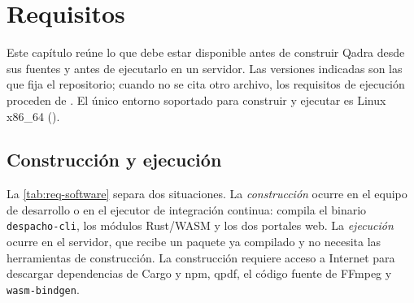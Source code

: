 \chapter{Requisitos}\label{cap:requisitos}

Este capítulo reúne lo que debe estar disponible antes de construir Qadra
desde sus fuentes y antes de ejecutarlo en un servidor. Las versiones
indicadas son las que fija el repositorio; cuando no se cita otro archivo,
los requisitos de ejecución proceden de . El
único entorno soportado para construir y ejecutar es
Linux x86\_64 ().

\section{Construcción y ejecución}\label{sec:req-tabla}

La \cref{tab:req-software} separa dos situaciones. La \emph{construcción}
ocurre en el equipo de desarrollo o en el ejecutor de integración continua:
compila el binario \texttt{despacho-cli}, los módulos Rust/WASM y los dos
portales web. La \emph{ejecución} ocurre en el servidor, que recibe un
paquete ya compilado y no necesita las herramientas de construcción. La
construcción requiere acceso a Internet para descargar dependencias de
Cargo y npm, qpdf, el código fuente de FFmpeg y \texttt{wasm-bindgen}.

